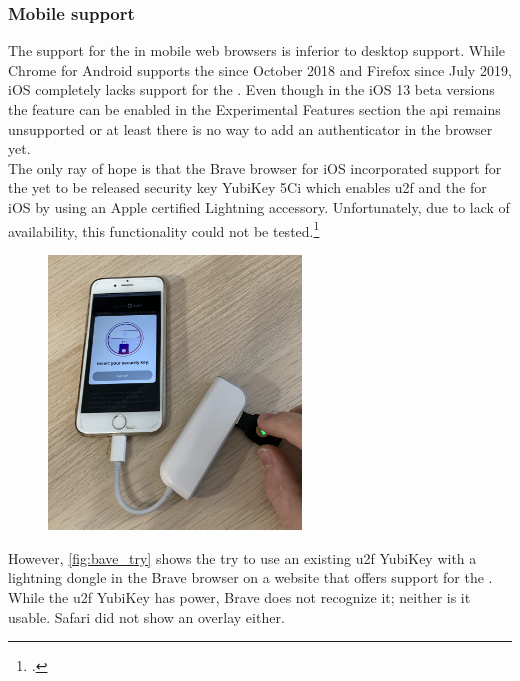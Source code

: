 \subsubsection{Mobile support}

The support for the \wa{} in mobile web browsers is inferior to desktop support. While Chrome for Android supports the \wa{} since October 2018 and Firefox since July 2019, iOS completely lacks support for the \wa. Even though in the iOS 13 beta versions the feature can be enabled in the \frqq Experimental Features\flqq{} section the \gls{api} remains unsupported or at least there is no way to add an authenticator in the browser yet.\\
The only ray of hope is that the Brave browser for iOS incorporated support for the yet to be released security key \frqq YubiKey 5Ci\flqq{} which enables \gls{u2f} and the \wa{} for iOS by using an Apple certified Lightning accessory. Unfortunately, due to lack of availability, this functionality could not be tested.\footcites[See][]{brave-ios}[See][]{brave-now-available}
\\

\begin{figure}[hbt]
	\centering
	\includegraphics[width=0.6\textwidth]{pics/brave_try_dongle.jpg}
	\caption{}
	\label{fig:bave_try}
\end{figure}

However, \autoref{fig:bave_try} shows the try to use an existing \gls{u2f} YubiKey with a lightning dongle in the Brave browser on a website that offers support for the \wa. While the \gls{u2f} YubiKey has power, Brave does not recognize it; neither is it usable. Safari did not show an overlay either.

